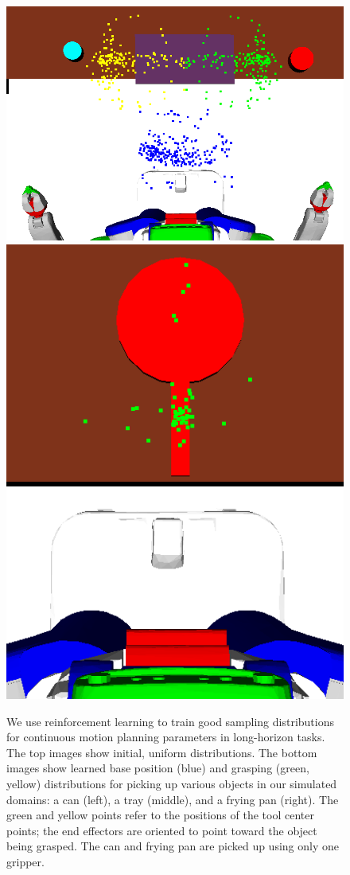 \begin{figure}[t]
    \includegraphics[scale=0.13]{images/dinner_tray_final.png}
    \includegraphics[scale=0.13]{images/frying_final.png}
  \caption{\small{We use reinforcement learning to train good sampling distributions for
      continuous motion planning parameters in long-horizon tasks. The top images show
      initial, uniform distributions. The bottom images show learned base position (blue) and
      grasping (green, yellow) distributions for picking up various objects in our simulated domains:
      a can (left), a tray (middle), and a frying pan (right).
      The green and yellow points refer to the positions of the tool center points;
      the end effectors are oriented to point toward the object being grasped. The can and
      frying pan are picked up using only one gripper.}}
  \label{fig:cover}
\end{figure}

